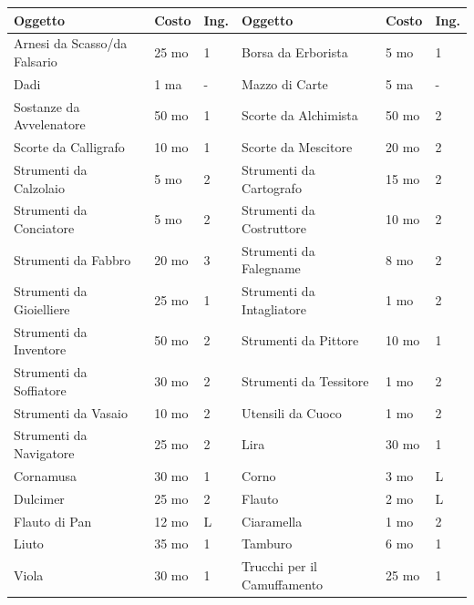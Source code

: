 \noindent\begin{tabularx}{\linewidth}{llX|llX}
	\toprule
\rowcolor{gray!20}\textbf{Oggetto}&\textbf{Costo}&\textbf{Ing.}&\textbf{Oggetto}&\textbf{Costo}&\textbf{Ing.}\\
\toprule
Arnesi da Scasso/da Falsario&25 mo&1&Borsa da Erborista&5 mo&1\\
\rowcolor{gray!20}Dadi&1 ma&-&Mazzo di Carte&5 ma&-\\
Sostanze da Avvelenatore&50 mo&1&Scorte da Alchimista&50 mo&2\\
\rowcolor{gray!20}Scorte da Calligrafo&10 mo&1&Scorte da Mescitore&20 mo&2\\
Strumenti da Calzolaio&5 mo&2&Strumenti da Cartografo&15 mo&2\\
\rowcolor{gray!20}Strumenti da Conciatore&5 mo&2&Strumenti da Costruttore&10 mo&2\\
Strumenti da Fabbro&20 mo&3&Strumenti da Falegname&8 mo&2\\
\rowcolor{gray!20}Strumenti da Gioielliere&25 mo&1&Strumenti da Intagliatore&1 mo&2\\
Strumenti da Inventore&50 mo&2&Strumenti da Pittore&10 mo&1\\
\rowcolor{gray!20}Strumenti da Soffiatore&30 mo&2&Strumenti da Tessitore&1 mo&2\\
Strumenti da Vasaio&10 mo&2&Utensili da Cuoco&1 mo&2\\
\rowcolor{gray!20}Strumenti da Navigatore&25 mo&2&Lira&30 mo&1\\
Cornamusa&30 mo&1&Corno&3 mo&L\\
\rowcolor{gray!20}Dulcimer&25 mo&2&Flauto&2 mo&L\\
Flauto di Pan&12 mo&L&Ciaramella &1 mo &2\\
\rowcolor{gray!20}Liuto&35 mo&1&Tamburo&6 mo&1\\
Viola&30 mo&1&Trucchi per il Camuffamento&25 mo&1\\
\end{tabularx}

